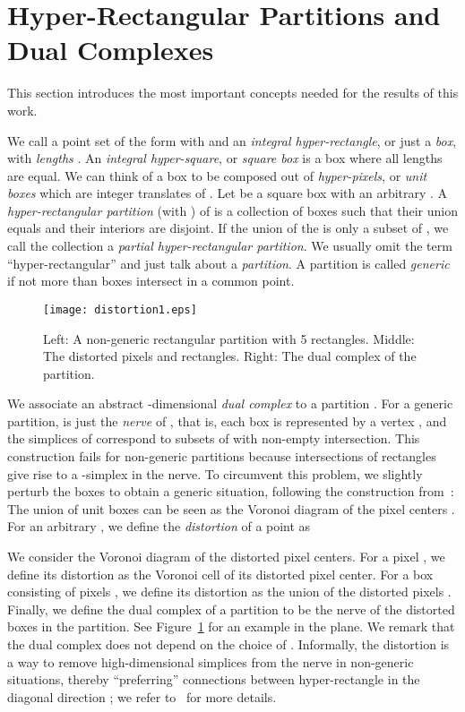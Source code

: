\documentclass[12pt]{article}
\begin{document}
\section{Hyper-Rectangular Partitions and Dual Complexes}
\label{sec:definitions}

This section introduces the most important concepts needed for the results
of this work. 

We call a point set of the form 
with  and  an \emph{integral hyper-rectangle},
or just a \emph{box}, with \emph{lengths} .
An \emph{integral hyper-square}, or \emph{square box} 
is a box where all lengths are equal.
We can think of a box to be composed out of \emph{hyper-pixels}, 
or \emph{unit boxes} which are integer translates of .
Let  be a square box with an arbitrary .
A \emph{hyper-rectangular partition}  (with ) 
of  is a collection of boxes  such that their union equals  and 
their interiors are disjoint. If the union of the  is only a subset of , 
we call the collection a \emph{partial hyper-rectangular partition}. 
We usually omit the term ``hyper-rectangular'' and just talk about a \emph{partition}.
A partition is called \emph{generic} if not more than  boxes 
intersect in a common point.

\begin{figure}
\begin{center}
\texttt{[image: distortion1.eps]}
\end{center}
\caption{Left: A non-generic rectangular partition with 5 rectangles. Middle: 
The distorted pixels and rectangles. Right: The dual complex of the partition.}
\label{fig:distortion}
\end{figure}

We associate an abstract -dimensional \emph{dual complex}  to a partition .
For a generic partition,  is just the \emph{nerve} of , that is, each box 
is represented by a vertex , and the simplices of  correspond to subsets
of  with non-empty intersection. This construction fails for non-generic
partitions because intersections of  rectangles give rise to a -simplex in the nerve.
To circumvent this problem, we slightly perturb the boxes to obtain a generic
situation, following the construction from~\cite{ek-freudenthal}: The union of unit boxes can
be seen as the Voronoi diagram of the pixel centers 
.
For an arbitrary , we define the \emph{distortion} of a point  as

We consider the Voronoi diagram of the distorted pixel centers. 
For a pixel , we define its distortion  as the Voronoi cell of its 
distorted pixel center. For a box consisting
of pixels , we define its distortion
as the union of the distorted pixels . Finally, we define
the dual complex  of a partition  to be the nerve of the distorted boxes
in the partition. See Figure~\ref{fig:distortion} for an example in the plane. We remark that
the dual complex does not depend on the choice of .
Informally, the distortion is a way to remove high-dimensional simplices from the nerve in
non-generic situations, thereby ``preferring'' connections between hyper-rectangle in the
diagonal direction ; we refer to~\cite{ek-freudenthal} for more details.
\end{document}
